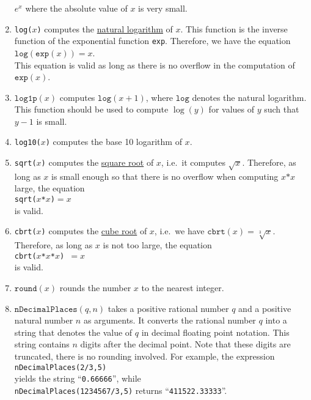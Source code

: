 \begin{enumerate}
      $e^x$ where the absolute value of $x$ is very small.
\item \texttt{log($x$)} computes the 
      \href{https://en.wikipedia.org/wiki/Natural_logarithm}{natural logarithm} of $x$.  This function is the
      inverse function of the exponential function \texttt{exp}.  Therefore, we have
      the equation
      \\[0.2cm]
      \hspace*{1.3cm}
      $\mathtt{log}(\mathtt{exp}(x)) = x$.
      \\[0.2cm]
      This equation is valid as long as there is no overflow in the computation of
      $\mathtt{exp}(x)$.
\item $\mathtt{log1p}(x)$ computes $\mathtt{log}(x + 1)$, where $\mathtt{log}$ denotes the natural
      logarithm.  This function should be used to compute $\log(y)$ for values of $y$ such that $y - 1$ is small.
\item \texttt{log10($x$)} computes the base 10 logarithm of $x$.
\item \texttt{sqrt($x$)} computes the \href{https://en.wikipedia.org/wiki/Square_root}{square root}
      of $x$, i.e.~it computes $\sqrt{x}$.  Therefore, as long as $x$ is small enough so that there
      is no overflow when computing $x\mathtt{*}x$ large, the equation 
      \\[0.2cm]
      \hspace*{1.3cm}
      \texttt{sqrt($x$*$x$)$=x$}
      \\[0.2cm]
      is valid.
\item \texttt{cbrt($x$)} computes the \href{https://en.wikipedia.org/wiki/Cube_root}{cube root} of
      $x$, i.e.~we have $\mathtt{cbrt}(x) = \sqrt[3]{x}$.  Therefore, as long as $x$ is not too large, the equation
      \\[0.2cm]
      \hspace*{1.3cm}
      \texttt{cbrt($x$*$x$*$x$) $= x$}
      \\[0.2cm]
      is valid.
\item $\texttt{round}(x)$ rounds the number $x$ to the nearest integer.
\item $\texttt{nDecimalPlaces}(q, n)$ takes a positive rational number $q$ and a positive natural
      number $n$ as arguments.  It converts the rational number $q$ into a string that denotes the
      value of $q$ in decimal floating point notation.  This string contains $n$ digits after the
      decimal point.  Note that these digits are truncated, there is no rounding
      involved.  For example, the expression
      \\[0.2cm]
      \hspace*{1.3cm}
      \texttt{nDecimalPlaces(2/3,5)}
      \\[0.2cm]
      yields the string ``\texttt{0.66666}'', while 
      \\[0.2cm]
      \hspace*{1.3cm}
      \texttt{nDecimalPlaces(1234567/3,5)} returns ``\texttt{411522.33333}''.


\end{enumerate}
